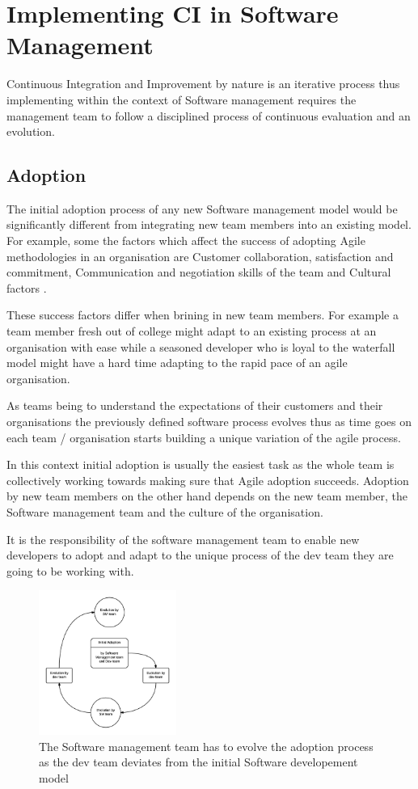 \documentclass[10pt,conference]{IEEEtran}
\begin{document}
\section*{Implementing CI in Software Management}

Continuous Integration and Improvement by nature is an iterative process thus implementing within the context of Software management requires the management team to follow a disciplined process of continuous evaluation and an evolution.

\subsection*{Adoption}
The initial adoption process of any new Software management model would be significantly different from integrating new team members into an existing model. For example, some the factors which affect the success of adopting Agile methodologies in an organisation are 
Customer collaboration, satisfaction and commitment, Communication and negotiation skills of the team and Cultural factors \cite{misra_identifying_2009}.

These success factors differ when brining in new team members. For example a team member fresh out of college might adapt to an existing process at an organisation with ease while a seasoned developer who is loyal to the waterfall model might have a hard time adapting to the rapid pace of an agile organisation. 

As teams being to understand the expectations of their customers and their organisations the previously defined software process evolves thus as time goes on each team / organisation starts building a unique variation of the agile process.

In this context initial adoption is usually the easiest task as the whole team is collectively working towards making sure that Agile adoption succeeds. Adoption by new team members on the other hand depends on the new team member, the Software management team and the culture of the organisation.

It is the responsibility of the software management team to enable new developers to adopt and adapt to the unique process of the dev team they are going to be working with.

\begin{figure}[t]
\centering
\includegraphics[width=0.4\textwidth]{sm_dev_team_process_evolution.png}
\caption{The Software management team has to evolve the adoption process as the dev team deviates from the initial Software developement model}
\end{figure}
\end{document}
